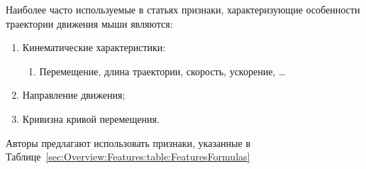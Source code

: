 \documentclass[12pt]{article}
\begin{document}
    \par Наиболее часто используемые в статьях признаки, характеризующие особенности траектории движения мыши являются:
    \begin{enumerate}
        \item Кинематические характеристики:
        \begin{enumerate}
            \item Перемещение, длина траектории, скорость, ускорение, \ldots
        \end{enumerate}
        \item Направление движения;
        \item Кривизна кривой перемещения.
    \end{enumerate}

    \par Авторы \cite{Mondal} предлагают использовать признаки, указанные в Таблице~\ref{sec:Overview:Features:table:FeaturesFormulas}
    
\end{document}
